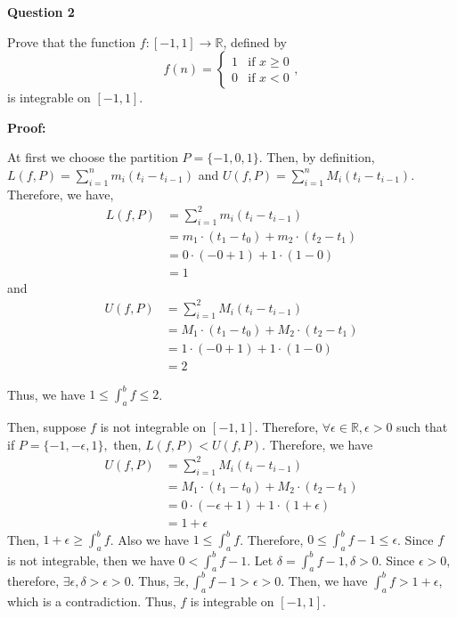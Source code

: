 \documentclass[a4paper,12pt]{report}
\newcommand{\R}{\mathbb{R}}
\begin{document}
\noindent
\textbf{Question 2}

\noindent
Prove that the function $f:[-1,1]\to\R$,
defined by 
\[
f(n) = \begin{cases} 1 &\mbox{if } x\geq 0 \\
0 & \mbox{if } x<0 \end{cases},
\]
is integrable on $[-1,1]$. 

\noindent
\textbf{Proof:}

\noindent
At first we choose the partition $P=\{-1,0,1\}$. Then, by definition, $L(f,P)=\sum_{i=1}^{n}m_i(t_i-t_{i-1})$ and $U(f,P)=\sum_{i=1}^{n}M_i(t_i-t_{i-1})$. Therefore, we have, 
\begin{align*}
L(f,P)&=\sum_{i=1}^{2}m_i(t_i-t_{i-1})\\
&=m_1\cdot{(t_1-t_0)}+m_2\cdot{(t_2-t_1)}\\
&=0\cdot{(-0+1)}+1\cdot{(1-0)}\\
&=1
\end{align*}
and 
\begin{align*}
U(f,P)&=\sum_{i=1}^{2}M_i(t_i-t_{i-1})\\
&=M_1\cdot{(t_1-t_0)}+M_2\cdot{(t_2-t_1)}\\
&=1\cdot{(-0+1)} + 1\cdot{(1-0)}\\
&=2
\end{align*}

\noindent
Thus, we have $1\leq \int_{a}^{b}f\leq 2$.

\noindent
Then, suppose $f$ is not integrable on $[-1,1]$. Therefore, $\forall \epsilon\in \mathbb{R}, \epsilon>0$ such that if $P=\{-1,-\epsilon,1\},$ then, $L(f,P)<U(f,P)$. Therefore, we have 
\begin{align*}
U(f,P)&=\sum_{i=1}^{2}M_i(t_i-t_{i-1})\\
&=M_1\cdot{(t_1-t_0)}+M_2\cdot{(t_2-t_1)}\\
&=0\cdot{(-\epsilon+1)}+1\cdot{(1+\epsilon)}\\
&=1+\epsilon
\end{align*}
Then, $1+\epsilon\geq \int_{a}^{b}f$. Also we have $1\leq \int_{a}^{b}f$. Therefore, $0\leq \int_{a}^{b}f-1\leq \epsilon$. Since $f$ is not integrable, then we have $0< \int_{a}^{b}f-1$. Let $\delta =\int_{a}^{b}f-1, \delta>0$. Since $\epsilon>0$, therefore, $\exists \epsilon, \delta>\epsilon>0$. Thus, $\exists \epsilon, \int_{a}^{b}f-1>\epsilon>0$. Then, we have $\int_{a}^{b}f>1+\epsilon$, which is a contradiction. Thus, $f$ is integrable on $[-1,1]$.  \\
\end{document}
